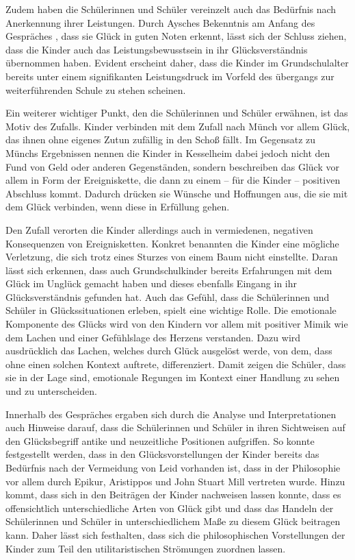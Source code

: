 Zudem haben die Schülerinnen und Schüler vereinzelt auch das Bedürfnis nach Anerkennung ihrer Leistungen. 
Durch Aysches Bekenntnis am Anfang des Gespräches , dass sie Glück in guten Noten erkennt,  lässt sich der Schluss ziehen, dass die Kinder auch das Leistungsbewusstsein in ihr Glücksverständnis übernommen haben. 
Evident erscheint daher, dass die Kinder im Grundschulalter bereits unter einem signifikanten Leistungsdruck im Vorfeld des übergangs zur weiterführenden Schule zu stehen scheinen. 

Ein weiterer wichtiger Punkt, den die Schülerinnen und Schüler erwähnen, ist das Motiv des Zufalls. 
Kinder verbinden mit dem Zufall nach Münch vor allem Glück, \glqq das ihnen ohne eigenes Zutun zufällig in den Schoß fällt.\grqq{}\cite{JM11, S.62}
Im Gegensatz zu Münchs Ergebnissen nennen die Kinder in Kesselheim dabei jedoch nicht den Fund von Geld oder anderen Gegenständen, sondern beschreiben das Glück vor allem in Form der Ereigniskette, die dann zu einem -- für die Kinder -- positiven Abschluss kommt. 
Dadurch drücken sie Wünsche und Hoffnungen aus, die sie mit dem Glück verbinden, wenn diese in Erfüllung gehen. 

Den Zufall verorten die Kinder allerdings auch in vermiedenen, negativen Konsequenzen von Ereignisketten. 
Konkret benannten die Kinder eine mögliche Verletzung, die sich trotz eines Sturzes von einem Baum nicht einstellte. 
Daran lässt sich erkennen, dass auch Grundschulkinder bereits Erfahrungen mit dem Glück im Unglück gemacht haben und dieses ebenfalls Eingang in ihr Glücksverständnis gefunden hat.
Auch das Gefühl, dass die Schülerinnen und Schüler in Glückssituationen erleben, spielt eine wichtige Rolle. 
Die emotionale Komponente des Glücks wird von den Kindern vor allem mit positiver Mimik wie dem Lachen und einer Gefühlslage des Herzens verstanden. 
Dazu wird ausdrücklich das Lachen, welches durch Glück ausgelöst werde, von dem, dass ohne einen solchen Kontext auftrete, differenziert. 
Damit zeigen die Schüler, dass sie in der Lage sind, emotionale Regungen im Kontext einer Handlung zu sehen und zu unterscheiden. 

Innerhalb des Gespräches ergaben sich durch die Analyse und Interpretationen auch Hinweise darauf, dass die Schülerinnen und Schüler in ihren Sichtweisen auf den Glücksbegriff antike und neuzeitliche Positionen aufgriffen. 
So konnte festgestellt werden, dass in den Glücksvorstellungen der Kinder bereits das Bedürfnis nach der Vermeidung von Leid vorhanden ist, dass in der Philosophie vor allem durch Epikur, Aristippos und John Stuart Mill vertreten wurde. 
Hinzu kommt, dass sich in den Beiträgen der Kinder nachweisen lassen konnte, dass es offensichtlich unterschiedliche Arten von Glück gibt und dass das Handeln der Schülerinnen und Schüler in unterschiedlichem Maße zu diesem Glück beitragen kann. 
Daher lässt sich festhalten, dass sich die philosophischen Vorstellungen der Kinder zum Teil den utilitaristischen Strömungen zuordnen lassen. 


